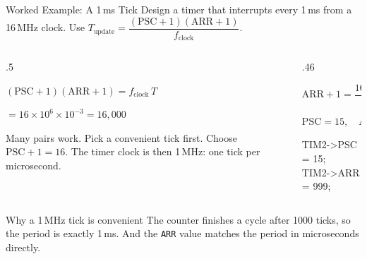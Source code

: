 \documentclass[9pt,aspectratio=169,xcolor=table]{beamer}
\begin{document}
\begin{frame}{Worked Example: A 1\,ms Tick}
    \leavevmode
    {\small Design a timer that interrupts every 1\,ms from a 16\,MHz clock. Use $T_{\text{update}} = \dfrac{(\text{PSC}+1)(\text{ARR}+1)}{f_{\text{clock}}}$.}

    \vspace{2mm}
    \begin{columns}[T]
    \begin{column}{.5\textwidth}
        {\small
        $(\text{PSC}+1)(\text{ARR}+1) = f_{\text{clock}}\,T$

        \vspace{1mm}
        $= 16\times10^{6}\times10^{-3} = 16{,}000$

        \vspace{2mm}
        Many pairs work. \alert{Pick a convenient tick first.} Choose $\text{PSC}+1 = 16$. The timer clock is then 1\,MHz: one tick per microsecond.}
    \end{column}
    \begin{column}{.46\textwidth}
        {\small
        $\text{ARR}+1 = \dfrac{16{,}000}{16} = 1000$

        \vspace{2mm}
        \alert{$\text{PSC} = 15,\quad \text{ARR} = 999$}}

        \vspace{2mm}
        {\ttfamily\scriptsize
        TIM2->PSC = 15; \\
        TIM2->ARR = 999;}
    \end{column}
    \end{columns}

    \vspace{3mm}
    \begin{block}{Why a 1\,MHz tick is convenient}
        The counter finishes a cycle after 1000 ticks, so the period is exactly 1\,ms. And the \texttt{ARR} value matches the period in microseconds directly.
    \end{block}
\end{frame}
\end{document}
